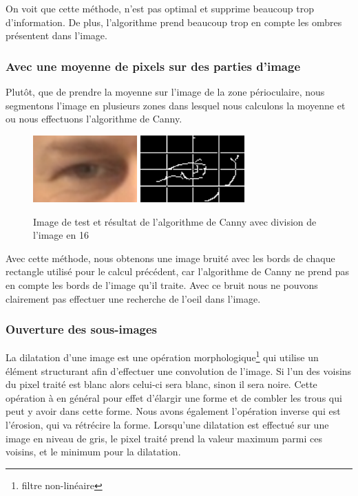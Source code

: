 On voit que cette méthode, n'est pas optimal et supprime beaucoup trop d'information. De plus,
l'algorithme prend beaucoup trop en compte les ombres présentent dans l'image.

\subsubsection{Avec une moyenne de pixels sur des parties d'image}

Plutôt, que de prendre la moyenne sur l'image de la zone périoculaire, nous segmentons l'image
en plusieurs zones dans lesquel nous calculons la moyenne et ou nous effectuons l'algorithme
de Canny.

\begin{figure}[H]
 \center
 \includegraphics[width=4cm]{image/original.png}
 \includegraphics[width=4cm]{image/canny_decomposition.png}
 \caption{Image de test et résultat de l'algorithme de Canny avec division de l'image en 16}
\end{figure}

Avec cette méthode, nous obtenons une image bruité avec les bords de chaque rectangle utilisé
pour le calcul précédent, car l'algorithme de Canny ne prend pas en compte les bords de l'image
qu'il traite. Avec ce bruit nous ne pouvons clairement pas effectuer une recherche de l'oeil dans
l'image.

\subsubsection{Ouverture des sous-images}

La dilatation d'une image est une opération morphologique\footnote{filtre non-linéaire} qui utilise 
un élément structurant afin d'effectuer une convolution de l'image. Si l'un des voisins du pixel traité
est blanc alors celui-ci sera blanc, sinon il sera noire.
Cette opération à en général pour effet d'élargir une forme et de combler les trous qui peut y avoir
dans cette forme. Nous avons également l'opération inverse qui est l'érosion, qui va rétrécire la forme.
Lorsqu'une dilatation est effectué sur une image en niveau de gris, le pixel traité prend la valeur maximum parmi
ces voisins, et le minimum pour la dilatation.\\

